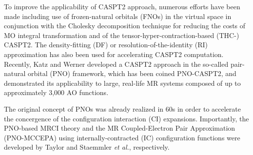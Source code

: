\documentclass[aip,jcp,amsmath,twocolumn,floatfix,reprint,fleqn]{revtex4-1}
\begin{document}
%
To improve the applicability of CASPT2 approach, numerous efforts have been made including use of frozen-natural orbitals (FNOs)\cite{doi:10.1063/1.3157463,doi:10.1021/acs.jctc.5b00479} in the virtual space in conjunction with the Cholesky decomposition technique for reducing the costs of MO integral transformation\cite{doi:10.1063/1.2953696,doi:10.1021/ct9000284,doi:10.1021/ct700263h,doi:10.1021/ct900612k} and of the tensor-hyper-contraction-based (THC-) CASPT2.\cite{doi:10.1063/1.5037283}
%
The density-fitting (DF) or resolution-of-the-identity (RI) approximation has also been used for accelerating CASPT2 computation.\cite{ShioWerner2013}
%
Recently, Katz and Werner developed a CASPT2 approach in the so-called pair-natural orbital (PNO) framework, which has been coined PNO-CASPT2, and demonstrated its applicability to large, real-life MR systems composed of up to approximately 3,000 AO functions.\cite{:/content/aip/journal/jcp/145/12/10.1063/1.4963019,doi:10.1063/1.5097644}

%
The original concept of PNOs was already realized in 60s in order to accelerate the concergence of the configuration interaction (CI) expansions.\cite{:/content/aip/journal/jcp/40/12/10.1063/1.1725065,:/content/aip/journal/jcp/48/4/10.1063/1.1668917,:/content/aip/journal/jcp/42/3/10.1063/1.1696050,:/content/aip/journal/jcp/45/5/10.1063/1.1727841,meyer1971ionization,:/content/aip/journal/jcp/58/3/10.1063/1.1679283,meyer1971ionization,Ahlrichs1968_2}
%
Importantly, the PNO-based MRCI theory and the MR Coupled-Electron Pair Approximation (PNO-MCCEPA) using internally-contracted (IC) configuration functions were developed by Taylor\cite{:/content/aip/journal/jcp/74/2/10.1063/1.441186} and Staemmler {\it et al.},\cite{Staemmler1993} respectively.
\end{document}

